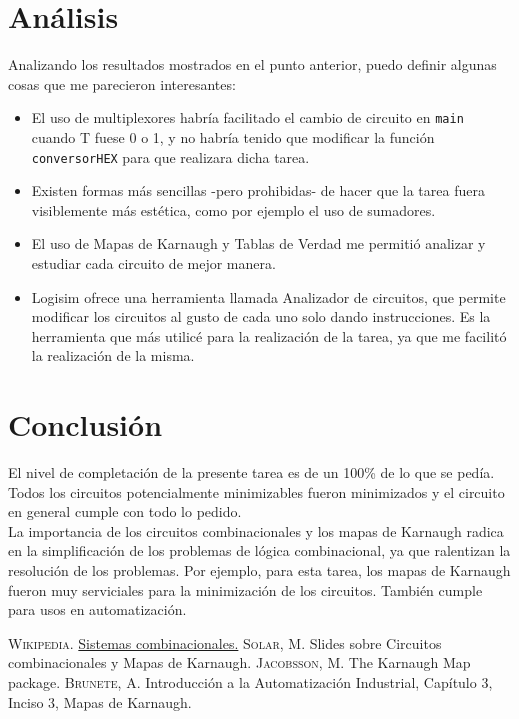 \documentclass[a4paper,11pt]{article}
\begin{document}
\section{Análisis}

Analizando los resultados mostrados en el punto anterior, puedo definir algunas cosas que me parecieron interesantes:

\begin{itemize}
    \item El uso de multiplexores habría facilitado el cambio de circuito en \texttt{main} cuando T fuese 0 o 1, y no habría tenido que modificar la función \texttt{conversorHEX} para que realizara dicha tarea.
    \item Existen formas más sencillas -pero prohibidas- de hacer que la tarea fuera visiblemente más estética, como por ejemplo el uso de sumadores.
    \item El uso de Mapas de Karnaugh y Tablas de Verdad me permitió analizar y estudiar cada circuito de mejor manera.
    \item Logisim ofrece una herramienta llamada Analizador de circuitos, que permite modificar los circuitos al gusto de cada uno solo dando instrucciones. Es la herramienta que más utilicé para la realización de la tarea, ya que me facilitó la realización de la misma.
\end{itemize}

\section{Conclusión}

El nivel de completación de la presente tarea es de un 100\% de lo que se pedía. Todos los circuitos potencialmente minimizables fueron minimizados y el circuito en general cumple con todo lo pedido.\\

La importancia de los circuitos combinacionales y los mapas de Karnaugh radica en la simplificación de los problemas de lógica combinacional, ya que ralentizan la resolución de los problemas. Por ejemplo, para esta tarea, los mapas de Karnaugh fueron muy serviciales para la minimización de los circuitos. También cumple para usos en automatización\cite{Map}.

\newpage
\begin{thebibliography}{X}
 \textsc{Wikipedia.} \href{https://es.wikipedia.org/wiki/Sistema_combinacional}{Sistemas combinacionales.}
 \textsc{Solar, M.} Slides sobre Circuitos combinacionales y Mapas de Karnaugh.
 \textsc{Jacobsson, M.} The Karnaugh Map package.
 \textsc{Brunete, A.} Introducción a la Automatización Industrial, Capítulo 3, Inciso 3, Mapas de Karnaugh.
\end{thebibliography}
\end{document}
